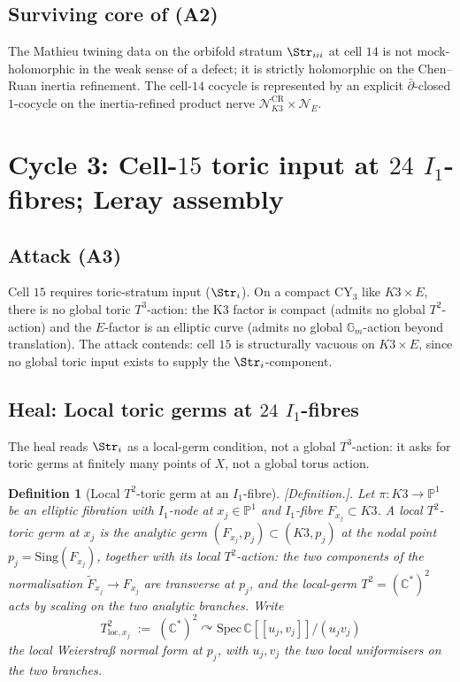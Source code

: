 \documentclass[11pt]{amsart}
\newtheorem{definition}[theorem]{Definition}
\providecommand{\C}{\mathbb{C}}
\providecommand{\cN}{\mathcal{N}}
\providecommand{\Gm}{\mathbb{G}_m}
\providecommand{\ClaimStatusDefinition}{[\emph{Definition.}]}
\begin{document}
\subsection*{Surviving core of (A2)}

The Mathieu twining data on the orbifold stratum $\Str_{iii}$ at cell
$14$ is not mock-holomorphic in the weak sense of a defect; it is
strictly holomorphic on the Chen--Ruan inertia refinement. The cell-$14$
cocycle is represented by an explicit $\bar\partial$-closed
$1$-cocycle on the inertia-refined product nerve
$\cN_{K3}^{\mathrm{CR}} \times \cN_E$.

\section{Cycle 3: Cell-$15$ toric input at $24$ $I_1$-fibres; Leray
assembly}

\subsection*{Attack (A3)}

Cell $15$ requires toric-stratum input ($\Str_i$). On a compact CY$_3$
like $K3 \times E$, there is no global toric $T^3$-action: the K3
factor is compact (admits no global $T^2$-action) and the $E$-factor
is an elliptic curve (admits no global $\Gm$-action beyond translation).
The attack contends: cell $15$ is structurally vacuous on $K3 \times E$,
since no global toric input exists to supply the $\Str_i$-component.

\subsection*{Heal: Local toric germs at $24$ $I_1$-fibres}

The heal reads $\Str_i$ as a local-germ condition, not a global
$T^3$-action: it asks for toric germs at finitely many points of $X$,
not a global torus action.

\begin{definition}[Local $T^2$-toric germ at an $I_1$-fibre]
\label{def:R13-local-toric-germ}
\ClaimStatusDefinition.
Let $\pi: K3 \to \mathbb{P}^1$ be an elliptic fibration with $I_1$-node
at $x_j \in \mathbb{P}^1$ and $I_1$-fibre $F_{x_j} \subset K3$. A
\emph{local $T^2$-toric germ} at $x_j$ is the analytic germ
$(F_{x_j}, p_j) \subset (K3, p_j)$ at the nodal point
$p_j = \mathrm{Sing}(F_{x_j})$, together with its local $T^2$-action:
the two components of the normalisation
$\tilde F_{x_j} \to F_{x_j}$ are transverse at $p_j$, and the
local-germ $T^2 = (\C^*)^2$ acts by scaling on the two analytic
branches. Write
\[
  T^2_{\mathrm{loc}, x_j} \;:=\; (\C^*)^2 \curvearrowright
  \mathrm{Spec}\,\C[[u_j, v_j]] / (u_j v_j)
\]
the local Weierstra\ss{} normal form at $p_j$, with $u_j, v_j$ the two
local uniformisers on the two branches.
\end{definition}
\end{document}
